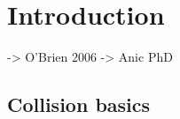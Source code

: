 \chapter{Introduction}
\label{ch01}

-> O'Brien 2006
-> Anic PhD





\section{Collision basics}




